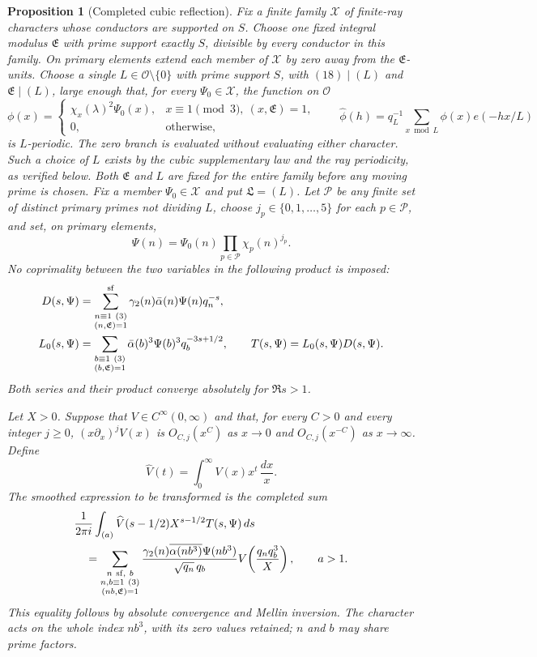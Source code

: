 \documentclass[11pt,a4paper]{article}
\numberwithin{equation}{section}
\numberwithin{figure}{section}
\newtheorem{proposition}[theorem]{Proposition}
\theoremstyle{definition}
\theoremstyle{remark}
\begin{document}
\begin{proposition}[Completed cubic reflection]
\label{prop:completed-reflection}
Fix a finite family $\mathcal X$ of finite-ray characters whose conductors
are supported on $S$.  Choose one fixed integral modulus $\mathfrak E$ with
prime support exactly $S$, divisible by every conductor in this family.
On primary elements extend each member of $\mathcal X$ by zero away from the
$\mathfrak E$-units.  Choose a single $L\in\mathcal O\setminus\{0\}$ with
prime support $S$, with $(18)\mid(L)$ and $\mathfrak E\mid(L)$, large enough
that, for every $\Psi_0\in\mathcal X$, the function on $\mathcal O$
\[
 \phi(x)=
 \begin{cases}
 \chi_x(\lambda)^2\Psi_0(x),&x\equiv1\pmod3,\ (x,\mathfrak E)=1,\\
 0,&\text{otherwise},
 \end{cases}
 \qquad
 \widehat\phi(h)=q_L^{-1}\sum_{x\bmod L}\phi(x)e(-hx/L)
\]
is $L$-periodic.  The zero branch is evaluated without evaluating either
character.  Such a choice of $L$ exists by the cubic supplementary law and
the ray periodicity, as verified below.  Both $\mathfrak E$ and $L$ are fixed
for the entire family before any moving prime is chosen.  Fix a member
$\Psi_0\in\mathcal X$ and put $\mathfrak L=(L)$.  Let $\mathcal P$ be any
finite set of distinct primary
primes not dividing $L$, choose $j_p\in\{0,1,\ldots,5\}$ for each
$p\in\mathcal P$, and set, on primary elements,
\[
 \Psi(n)=\Psi_0(n)\prod_{p\in\mathcal P}\chi_p(n)^{j_p}.
\]
No coprimality between the two variables in the following product is
imposed:
\[
 \begin{split}
 D(s,\Psi)&=\sum_{\substack{n\equiv1\ (3)\\(n,\mathfrak E)=1}}^{\rm sf}
       \gamma_2(n)\bar\alpha(n)\Psi(n)q_n^{-s},\\
 L_0(s,\Psi)&=\sum_{\substack{b\equiv1\ (3)\\(b,\mathfrak E)=1}}
       \bar\alpha(b)^3\Psi(b)^3q_b^{-3s+1/2},
       \qquad T(s,\Psi)=L_0(s,\Psi)D(s,\Psi).
 \end{split}
\]
Both series and their product converge absolutely for $\Re s>1$.

Let $X>0$.  Suppose that $V\in C^\infty(0,\infty)$ and that, for every
$C>0$ and every integer $j\ge0$, $(x\partial_x)^jV(x)$ is $O_{C,j}(x^C)$ as
$x\to0$ and $O_{C,j}(x^{-C})$ as $x\to\infty$.  Define
\[
 \widehat V(t)=\int_0^\infty V(x)x^t\,\frac{dx}{x}.
\]
The smoothed expression to be transformed is the completed sum
\[
 \begin{split}
 &\frac1{2\pi i}\int_{(a)}\widehat V(s-1/2)X^{s-1/2}T(s,\Psi)\,ds\\
 &\quad=\sum_{\substack{n\ {\rm sf},\ b\\n,b\equiv1\ (3)\\(nb,\mathfrak E)=1}}
 \frac{\gamma_2(n)\overline{\alpha(nb^3)}\Psi(nb^3)}
      {\sqrt{q_n}\,q_b}
 V\!\left(\frac{q_nq_b^3}{X}\right),\qquad a>1.
 \end{split}
\]
This equality follows by absolute convergence and Mellin inversion.
The character acts on the whole index $nb^3$, with its zero values retained;
$n$ and $b$ may share prime factors.


\end{proposition}
\end{document}
